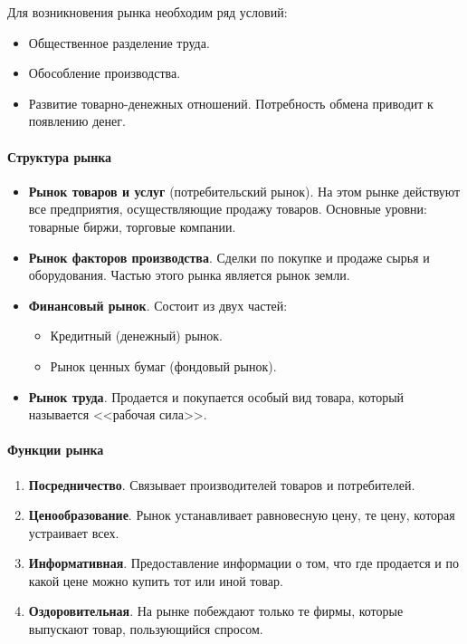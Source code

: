 \documentclass[12pt]{article}
\begin{document}
	Для возникновения рынка необходим ряд условий:
	
	\begin{itemize}
		\item Общественное разделение труда.
		\item Обособление производства.
		\item Развитие товарно-денежных отношений. Потребность обмена приводит к появлению денег.
	\end{itemize}
	
	\paragraph{Структура рынка}
	
	\begin{itemize}
		\item \textbf{Рынок товаров и услуг} (потребительский рынок). На этом рынке действуют все предприятия, осуществляющие продажу товаров. Основные уровни: товарные биржи, торговые компании.
		\item \textbf{Рынок факторов производства}. Сделки по покупке и продаже сырья и оборудования. Частью этого рынка является рынок земли.
		\item \textbf{Финансовый рынок}. Состоит из двух частей:
		\begin{itemize}
			\item Кредитный (денежный) рынок.
			\item Рынок ценных бумаг (фондовый рынок).
		\end{itemize}
		\item \textbf{Рынок труда}. Продается и покупается особый вид товара, который называется <<рабочая сила>>.
	\end{itemize}
	
	\paragraph{Функции рынка}
	
	\begin{enumerate}
		\item \textbf{Посредничество}. Связывает производителей товаров и потребителей.
		\item \textbf{Ценообразование}. Рынок устанавливает равновесную цену, те цену, которая устраивает всех.
		\item \textbf{Информативная}. Предоставление информации о том, что где продается и по какой цене можно купить тот или иной товар.
		\item \textbf{Оздоровительная}. На рынке побеждают только те фирмы, которые выпускают товар, пользующийся спросом.
	\end{enumerate}
	
\end{document}
